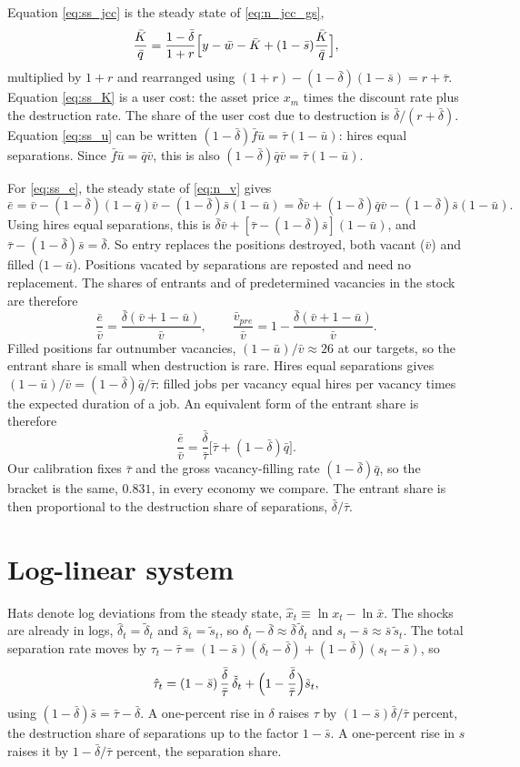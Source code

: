 \documentclass[authoryear, review, 12pt]{elsarticle}
\begin{document}
Equation \eqref{eq:ss_jcc} is the steady state of \eqref{eq:n_jcc_gs},
\[
	\frac{\bar K}{\bar q}
	=\frac{1-\bar\delta}{1+r}\Bigl[y-\bar w-\bar K+(1-\bar s)\frac{\bar K}{\bar q}\Bigr],
\]
multiplied by $1+r$ and rearranged using $(1+r)-(1-\bar\delta)(1-\bar s)=r+\bar\tau$. Equation
\eqref{eq:ss_K} is a user cost: the asset price $x_m$ times the discount rate plus the
destruction rate. The share of the user cost due to destruction is $\bar\delta/(r+\bar\delta)$.
Equation \eqref{eq:ss_u} can be written $(1-\bar\delta)\bar f\bar u=\bar\tau(1-\bar u)$:
hires equal separations. Since $\bar f\bar u=\bar q\bar v$, this is also
$(1-\bar\delta)\bar q\bar v=\bar\tau(1-\bar u)$.

For \eqref{eq:ss_e}, the steady state of \eqref{eq:n_v} gives
\[
	\bar e=\bar v-(1-\bar\delta)(1-\bar q)\bar v-(1-\bar\delta)\bar s(1-\bar u)
	=\bar\delta\bar v+(1-\bar\delta)\bar q\bar v-(1-\bar\delta)\bar s(1-\bar u).
\]
Using hires equal separations, this is $\bar\delta\bar v+[\bar\tau-(1-\bar\delta)\bar s](1-\bar u)$,
and $\bar\tau-(1-\bar\delta)\bar s=\bar\delta$. So entry replaces the positions destroyed, both
vacant ($\bar v$) and filled ($1-\bar u$). Positions vacated by separations are reposted
and need no replacement. The shares of entrants and of predetermined vacancies in the stock
are therefore
\[
	\frac{\bar e}{\bar v}=\frac{\bar\delta(\bar v+1-\bar u)}{\bar v},
	\qquad
	\frac{\bar v_{pre}}{\bar v}=1-\frac{\bar\delta(\bar v+1-\bar u)}{\bar v}.
\]
Filled positions far outnumber vacancies, $(1-\bar u)/\bar v\approx26$ at our targets, so
the entrant share is small when destruction is rare. Hires equal separations gives
$(1-\bar u)/\bar v=(1-\bar\delta)\bar q/\bar\tau$: filled jobs per vacancy equal hires per
vacancy times the expected duration of a job. An equivalent form of the entrant share is
therefore
\[
	\frac{\bar e}{\bar v}=\frac{\bar\delta}{\bar\tau}\bigl[\bar\tau+(1-\bar\delta)\bar q\bigr].
\]
Our calibration fixes $\bar\tau$ and the gross vacancy-filling rate $(1-\bar\delta)\bar q$, so
the bracket is the same, $0.831$, in every economy we compare. The entrant share is then
proportional to the destruction share of separations, $\bar\delta/\bar\tau$.

\section{Log-linear system}

Hats denote log deviations from the steady state, $\hat x_t\equiv\ln x_t-\ln\bar x$. The
shocks are already in logs, $\hat\delta_t=\tilde\delta_t$ and $\hat s_t=\tilde s_t$, so
$\delta_t-\bar\delta\approx\bar\delta\,\tilde\delta_t$ and $s_t-\bar s\approx\bar s\,\tilde s_t$.
The total separation rate moves by
$\tau_t-\bar\tau=(1-\bar s)(\delta_t-\bar\delta)+(1-\bar\delta)(s_t-\bar s)$, so
\[
	\hat\tau_t=(1-\bar s)\,\frac{\bar\delta}{\bar\tau}\,\tilde\delta_t
	+\Bigl(1-\frac{\bar\delta}{\bar\tau}\Bigr)\tilde s_t ,
\]
using $(1-\bar\delta)\bar s=\bar\tau-\bar\delta$. A one-percent rise in $\delta$ raises $\tau$
by $(1-\bar s)\bar\delta/\bar\tau$ percent, the destruction share of separations up to the
factor $1-\bar s$. A one-percent rise in $s$ raises it by $1-\bar\delta/\bar\tau$ percent, the
separation share.
\end{document}
